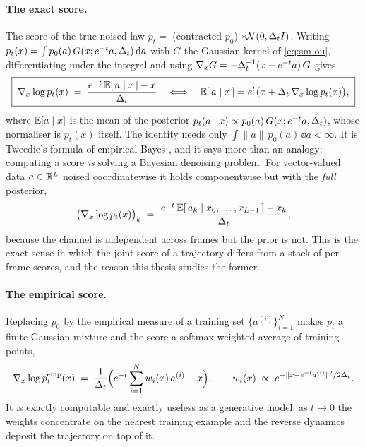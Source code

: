 \paragraph{The exact score.} The score of the true noised law
$p_t = $ (contracted $p_0$) $* \mathcal{N}(0,\Delta_t I)$. Writing $p_t(x) = \int
p_0(a)\, G(x; e^{-t}a, \Delta_t)\,\mathrm{d} a$ with $G$ the Gaussian kernel of
\eqref{eq:sm-ou}, differentiating under the integral and using
$\nabla_x G = -\Delta_t^{-1}(x - e^{-t}a)\,G$ gives
\begin{equation}
  \boxed{\;
  \nabla_x \log p_t(x)
  \;=\; \frac{e^{-t}\,\mathbb{E}[\,a \mid x\,] - x}{\Delta_t}
  \quad\Longleftrightarrow\quad
  \mathbb{E}[\,a \mid x\,]
  = e^{t}\big( x + \Delta_t\, \nabla_x \log p_t(x) \big),
  \;}
  \label{eq:tweedie}
\end{equation}
where $\mathbb{E}[a \mid x]$ is the mean of the posterior
$p_t(a \mid x) \propto p_0(a)\,G(x; e^{-t}a, \Delta_t)$, whose normaliser is
$p_t(x)$ itself. The identity needs only $\int \|a\|\,p_0(a)\,\dd a < \infty$.
It is Tweedie's formula of empirical Bayes \citep{robbins1956empirical,
miyasawa1961empirical, efron2011tweedie}, and it says more than an analogy:
computing a score \emph{is} solving a Bayesian denoising problem. For
vector-valued data $a \in \mathbb{R}^{L}$ noised coordinatewise it holds
componentwise but with the \emph{full} posterior,
\begin{equation}
  \big( \nabla_x \log p_t(x) \big)_k
  \;=\; \frac{e^{-t}\, \mathbb{E}[\,a_k \mid x_0, \dots, x_{L-1}\,] - x_k}{\Delta_t},
  \label{eq:tweedie-joint}
\end{equation}
because the channel is independent across frames but the prior is not. This
is the exact sense in which the joint score of a trajectory differs from a
stack of per-frame scores, and the reason this thesis studies the former.

\paragraph{The empirical score.} Replacing $p_0$ by the empirical measure of a
training set $\{a^{(i)}\}_{i=1}^{N}$ makes $p_t$ a finite Gaussian mixture and
the score a softmax-weighted average of training points,
\begin{equation}
  \nabla_x \log p^{\mathrm{emp}}_t(x)
  \;=\; \frac{1}{\Delta_t}\Big(
  e^{-t} \sum_{i=1}^{N} w_i(x)\, a^{(i)} - x \Big),
  \qquad
  w_i(x) \;\propto\; e^{-\lVert x - e^{-t} a^{(i)}\rVert^2 / 2\Delta_t}.
  \label{eq:sm-empirical}
\end{equation}
It is exactly computable and exactly useless as a generative model: as
$t \to 0$ the weights concentrate on the nearest training example and the
reverse dynamics deposit the trajectory on top of it.

